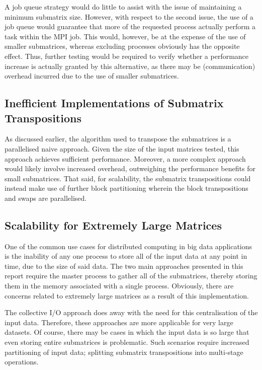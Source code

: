 \documentclass[journal,10pt,a4paper]{IEEEtran}
\begin{document}
A job queue strategy would do little to assist with the issue of maintaining a minimum submatrix size. However, with respect to the second issue, the use of a job queue would guarantee that more of the requested process actually perform a task within the MPI job. This would, however, be at the expense of the use of smaller submatrices, whereas excluding processes obviously has the opposite effect. Thus, further testing would be required to verify whether a performance increase is actually granted by this alternative, as there may be (communication) overhead incurred due to the use of smaller submatrices.


\vspace*{-0.3 cm}

\subsection{Inefficient Implementations of Submatrix Transpositions}

As discussed earlier, the algorithm used to transpose the submatrices is a parallelised naive approach. Given the size of the input matrices tested, this approach achieves sufficient performance. Moreover, a more complex approach would likely involve increased overhead, outweighing the performance benefits for small submatrices. That said, for scalability, the submatrix transpositions could instead make use of further block partitioning wherein the block transpositions and swaps are parallelised.


\subsection{Scalability for Extremely Large Matrices}

One of the common use cases for distributed computing in big data applications is the inability of any one process to store all of the input data at any point in time, due to the size of said data. The two main approaches presented in this report require the master process to gather all of the submatrices, thereby storing them in the memory associated with a single process. Obviously, there are concerns related to extremely large matrices as a result of this implementation.

The collective I/O approach does away with the need for this centralisation of the input data. Therefore, these approaches are more applicable for very large datasets. Of course, there may be cases in which the input data is so large that even storing entire submatrices is problematic. Such scenarios require increased partitioning of input data; splitting submatrix transpositions into multi-stage operations.
\end{document}
